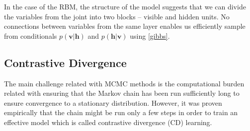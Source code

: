 \documentclass[../report/report.tex]{subfiles}
\begin{document}
In the case of the RBM, the structure of the model suggests that we can divide the variables from the joint into two blocks -- visible and hidden units. No connections between variables from the same layer enables us efficiently sample from conditionals $p(\mathbf{v}| \mathbf{h})$ and $p(\mathbf{h} | \mathbf{v})$ using \ref{gibbs}.
    
\subsection{Contrastive Divergence}
The main challenge related with MCMC methods is the computational burden related with ensuring that the Markov chain has been run sufficiently long to ensure convergence to a stationary distribution. However, it was proven empirically that the chain might be run only a few steps in order to train an effective model \cite{hinton2002training} which is called contrastive divergence (CD) learning. 
 
\end{document}
